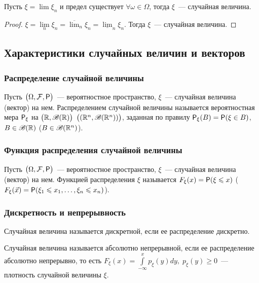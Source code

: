 \begin{consequence}
	Пусть $\xi = \lim \xi_n$ и предел существует $\forall \omega \in \Omega$, тогда $\xi$~--- случайная величина.
	\begin{proof}
	$\xi = \lim\limits_n \xi_n = \overline{\lim}_n \xi_n = \underline{\lim}_n \xi_n$. Тогда $\xi$~--- случайная величина.
	\end{proof}
\end{consequence}

\subsection{Характеристики случайных величин и векторов}
\subsubsection*{ Распределение случайной величины}
\begin{definition}
	Пусть $\big(\Omega, \F, \P \big)$~--- вероятностное пространство, $\xi$~--- случайная величина (вектор) на нем. Распределением случайной величины называется вероятностная мера $\P_\xi$ на $\big(\R, \B(\R)\big)$ $\big((\R^n, \B(\R^n))\big)$, заданная по правилу $\P_\xi(B) = \P(\xi \in B)$, $B \in \B(\R)$ ($B \in \B(\R^n)$).
\end{definition}

\subsubsection*{ Функция распределения случайной величины}
\begin{definition}
	Пусть $\big(\Omega, \F, \P\big)$~--- вероятностное пространство, $\xi$~--- случайная величина (вектор) на нем. Функцией распределения $\xi$ называется $F_\xi(x) = \P(\xi \leqslant x)$ ($F_\xi(\vec x) = \P(\xi_1 \leqslant x_1, \ldots, \xi_n \leqslant x_n)$).
\end{definition}

\subsubsection*{ Дискретность и непрерывность}
\begin{definition}
	Случайная величина называется дискретной, если ее распределение дискретно.
\end{definition}

\begin{definition}
	Случайная величина называется абсолютно непрерывной, если ее распределение абсолютно непрерывно, то есть $F_\xi(x) = \int\limits_{-\infty}^xp_\xi(y)dy,\; p_\xi(y) \geqslant 0$~--- плотность случайной величины $\xi$.
\end{definition}

